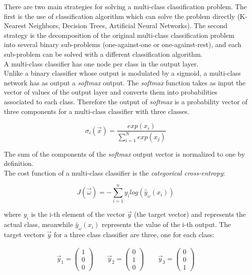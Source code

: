 There are two main strategies for solving a multi-class classification problem. 
The first is the use of classification algorithm which can solve the problem directly (K-Nearest Neighbors, Decision
Trees, Artificial Neural Networks). 
The second strategy is the decomposition of the original multi-class classification problem 
into several binary sub-problems (one-against-one or one-against-rest), and each sub-problem can be solved with a different 
classification algorithm.\\

A multi-class classifier has one node per class in the output layer.\\
Unlike a binary classifier whose output is modulated by a sigmoid, a multi-class network has as output a \textit{softmax} output. 
The \textit{softmax} function takes as input the vector of values of the output layer and converts them into probabilities associated to each class. 
Therefore the output of \textit{softmax} is a probability vector of three components for a multi-class classifier with three classes.

\begin{equation}
\sigma_i(\vec{x}) = \frac{exp(x_i)}{\sum^N_{i=1} exp(x_j)}
\end{equation}

The sum of the components of the \textit{softmax} output vector is normalized to one by definition.\\
The cost function of a multi-class classifier is the \textit{categorical cross-entropy}:

\begin{equation}
J(\vec{\omega}) = - \sum_{i=1}^{n} y_i log(\hat{y}_{\omega}(x_i))
\end{equation}


where $y_i$ is the i-th element of the vector $\vec{y}$ (the target vector) and represents the actual class, meanwhile $\hat{y}_{\omega}(x_i)$ represents the value of the i-th output.
The target vectors $\vec{y}$ for a three class classifier are three, one for each class:



\begin{align}
\vec{y}_1 = \begin{pmatrix}
1\\
0\\
0
\end{pmatrix}
\qquad
\vec{y}_2 = \begin{pmatrix}
0\\
1\\
0
\end{pmatrix}
\qquad
\vec{y}_3 =\begin{pmatrix}
0\\
0\\
1
\end{pmatrix}
\end{align}






